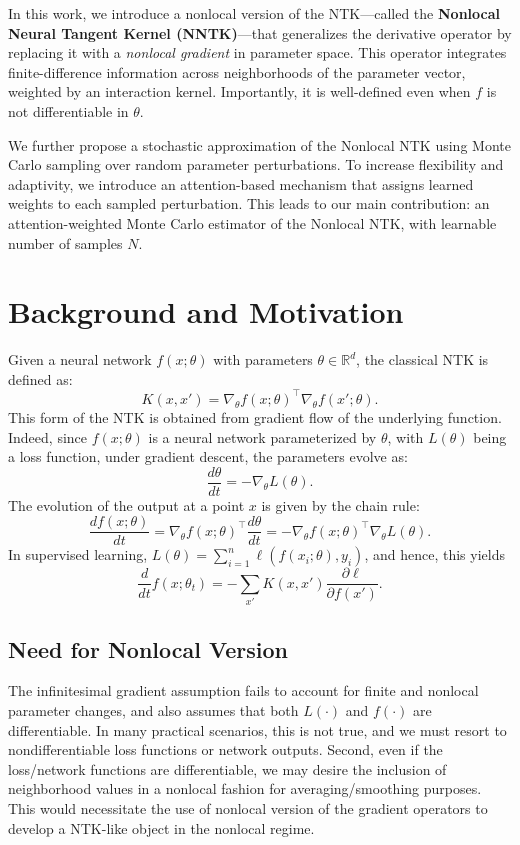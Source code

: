 \documentclass[11pt]{article}
\theoremstyle{plain}
\begin{document}
In this work, we introduce a nonlocal version of the NTK—called the \textbf{Nonlocal Neural Tangent Kernel (NNTK)}—that generalizes the derivative operator by replacing it with a \emph{nonlocal gradient} in parameter space. This operator integrates finite-difference information across neighborhoods of the parameter vector, weighted by an interaction kernel. Importantly, it is well-defined even when \( f \) is not differentiable in \( \theta \).

We further propose a stochastic approximation of the Nonlocal NTK using Monte Carlo sampling over random parameter perturbations. To increase flexibility and adaptivity, we introduce an attention-based mechanism that assigns learned weights to each sampled perturbation. This leads to our main contribution: an attention-weighted Monte Carlo estimator of the Nonlocal NTK, with learnable number of samples $N$.

\section{Background and Motivation}
Given a neural network $f(x; \theta)$ with parameters $\theta \in \mathbb{R}^d$, the classical NTK is defined as:
\[
K(x, x') = \nabla_\theta f(x; \theta)^\top \nabla_\theta f(x'; \theta).
\]
This form of the NTK is obtained from gradient flow of the underlying function. Indeed, since \( f(x; \theta) \) is a neural network parameterized by \( \theta \), with \( L(\theta) \) being a loss function, under gradient descent, the parameters evolve as:
\[
\frac{d\theta}{dt} = -\nabla_\theta L(\theta).
\]
The evolution of the output at a point \( x \) is given by the chain rule:
\[
\frac{df(x; \theta)}{dt} = \nabla_\theta f(x; \theta)^\top \frac{d\theta}{dt} = -\nabla_\theta f(x; \theta)^\top \nabla_\theta L(\theta).
\]
In supervised learning, \( L(\theta) = \sum_{i=1}^n \ell(f(x_i; \theta), y_i) \), and hence, this yields \[
\frac{d}{dt} f(x; \theta_t) = -\sum_{x'} K(x, x') \frac{\partial \ell}{\partial f(x')}.
\]

\subsection{Need for Nonlocal Version}
The infinitesimal gradient assumption fails to account for finite and nonlocal parameter changes, and also assumes that both $L(\cdot)$ and $f(\cdot)$ are differentiable. In many practical scenarios, this is not true, and we must resort to nondifferentiable loss functions or network outputs. Second, even if the loss/network functions are differentiable, we may desire the inclusion of neighborhood values in a nonlocal fashion for averaging/smoothing purposes. This would necessitate the use of nonlocal version of the gradient operators to develop a NTK-like object in the nonlocal regime. 
\end{document}
